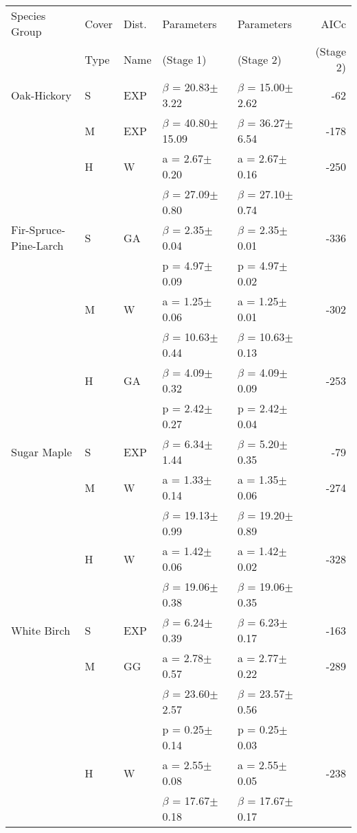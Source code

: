 \documentclass{article}
\begin{document}
\thispagestyle{empty}
\begin{table}
{\footnotesize
\begin{tabular}{lllllr}
\toprule
Species Group & Cover & Dist. & Parameters & Parameters & AICc \\
& Type & Name & (Stage 1) & (Stage 2) & (Stage 2) \\
\midrule
Oak-Hickory & S & EXP & $\beta$ = 20.83$\pm$3.22 & $\beta$ = 15.00$\pm$2.62 & -62 \\
 & M & EXP & $\beta$ = 40.80$\pm$15.09 & $\beta$ = 36.27$\pm$6.54 & -178 \\
 & H & W & a = 2.67$\pm$0.20 & a = 2.67$\pm$0.16 & -250 \\
 &  &  & $\beta$ = 27.09$\pm$0.80 & $\beta$ = 27.10$\pm$0.74 &  \\
Fir-Spruce-Pine-Larch & S & GA & $\beta$ = 2.35$\pm$0.04 & $\beta$ = 2.35$\pm$0.01 & -336 \\
 &  &  & p = 4.97$\pm$0.09 & p = 4.97$\pm$0.02 &  \\
 & M & W & a = 1.25$\pm$0.06 & a = 1.25$\pm$0.01 & -302 \\
 &  &  & $\beta$ = 10.63$\pm$0.44 & $\beta$ = 10.63$\pm$0.13 &  \\
 & H & GA & $\beta$ = 4.09$\pm$0.32 & $\beta$ = 4.09$\pm$0.09 & -253 \\
 &  &  & p = 2.42$\pm$0.27 & p = 2.42$\pm$0.04 &  \\
Sugar Maple & S & EXP & $\beta$ = 6.34$\pm$1.44 & $\beta$ = 5.20$\pm$0.35 & -79 \\
 & M & W & a = 1.33$\pm$0.14 & a = 1.35$\pm$0.06 & -274 \\
 &  &  & $\beta$ = 19.13$\pm$0.99 & $\beta$ = 19.20$\pm$0.89 &  \\
 & H & W & a = 1.42$\pm$0.06 & a = 1.42$\pm$0.02 & -328 \\
 &  &  & $\beta$ = 19.06$\pm$0.38 & $\beta$ = 19.06$\pm$0.35 &  \\
White Birch & S & EXP & $\beta$ = 6.24$\pm$0.39 & $\beta$ = 6.23$\pm$0.17 & -163 \\
 & M & GG & a = 2.78$\pm$0.57 & a = 2.77$\pm$0.22 & -289 \\
 &  &  & $\beta$ = 23.60$\pm$2.57 & $\beta$ = 23.57$\pm$0.56 &  \\
 &  &  & p = 0.25$\pm$0.14 & p = 0.25$\pm$0.03 &  \\
 & H & W & a = 2.55$\pm$0.08 & a = 2.55$\pm$0.05 & -238 \\
 &  &  & $\beta$ = 17.67$\pm$0.18 & $\beta$ = 17.67$\pm$0.17 &  \\

\end{tabular}}
\end{table}
\end{document}
